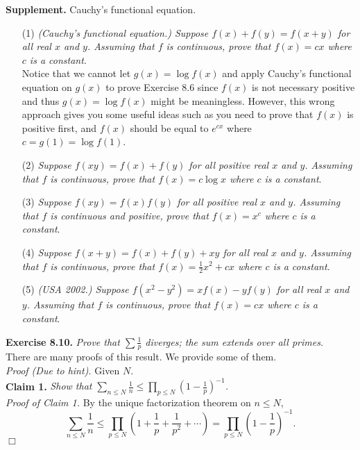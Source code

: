 \documentclass{article}
\begin{document}
\textbf{Supplement.} Cauchy's functional equation.
\begin{enumerate}
\item[(1)]
\emph{(Cauchy's functional equation.) Suppose $f(x) + f(y) = f(x + y)$ for all real $x$ and $y$.
Assuming that $f$ is continuous, prove that $f(x) = cx$ where $c$ is a constant}. \\

Notice that we cannot let $g(x) = \log f(x)$
and apply Cauchy's functional equation on $g(x)$
to prove Exercise 8.6 since $f(x)$ is not necessary positive and thus
$g(x) = \log f(x)$ might be meaningless.
However, this wrong approach gives you some useful ideas such as
you need to prove that $f(x)$ is positive first,
and $f(x)$ should be equal to $e^{cx}$ where $c = g(1) = \log f(1)$.

\item[(2)]
\emph{Suppose $f(xy) = f(x) + f(y)$ for all positive real $x$ and $y$.
Assuming that $f$ is continuous, prove that $f(x) = c \log x$ where $c$ is a constant}.

\item[(3)]
\emph{Suppose $f(xy) = f(x)f(y)$ for all positive real $x$ and $y$.
Assuming that $f$ is continuous and positive,
prove that $f(x) = x^c$ where $c$ is a constant}.

\item[(4)]
\emph{Suppose $f(x + y) = f(x) + f(y) + xy$ for all real $x$ and $y$.
Assuming that $f$ is continuous,
prove that $f(x) = \frac{1}{2}x^2 + cx$ where $c$ is a constant}.

\item[(5)]
\emph{(USA 2002.) Suppose $f(x^2 - y^2) = x f(x) - y f(y)$ for all real $x$ and $y$.
Assuming that $f$ is continuous,
prove that $f(x) = cx$ where $c$ is a constant}. \\
\end{enumerate}



\textbf{Exercise 8.10.}
\emph{Prove that $\sum \frac{1}{p}$ diverges; the sum extends over all primes.} \\

There are many proofs of this result. We provide some of them. \\

\emph{Proof (Due to hint).}
Given $N$. \\
\textbf{Claim 1.}
\emph{Show that $\sum_{n \leq N} \frac{1}{n}
\leq \prod_{p \leq N} \left( 1 - \frac{1}{p} \right)^{-1}$.} \\
\emph{Proof of Claim 1.}
By the unique factorization theorem on $n \leq N$,
$$\sum_{n \leq N} \frac{1}{n}
\leq \prod_{p \leq N} \left( 1 + \frac{1}{p} + \frac{1}{p^2} + \cdots \right)
= \prod_{p \leq N} \left( 1 - \frac{1}{p} \right)^{-1}.$$
$\Box$ \\
\end{document}
